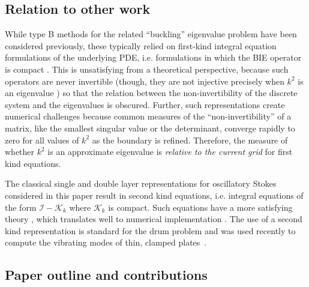 \subsection{Relation to other work}

While type B methods for the
related ``buckling'' eigenvalue problem
have been considered previously,
these typically relied on first-kind integral
equation formulations of the underlying PDE,
i.e. formulations in which the BIE operator is
compact \cite{kitahara2014boundary,antunes2011buckling}.
%
This is unsatisfying from a theoretical
perspective, because such operators are never invertible
(though, they are not injective precisely when $k^2$ is an
eigenvalue \cite{kitahara2014boundary,antunes2011buckling})
so that the relation between the non-invertibility of the
discrete system and the eigenvalues is obscured.
%
Further,
such representations create numerical challenges because
common measures of the ``non-invertibility'' of a matrix,
like the smallest singular value or the determinant, converge
rapidly to zero for all values of $k^2$ as the boundary is
refined. Therefore, the measure of whether $k^2$ is an
approximate eigenvalue is {\em relative to the current grid}
for first kind equations.

The classical single and double layer representations
for oscillatory Stokes considered in this paper
result in second kind equations, i.e. integral equations
of the form $\mathcal{I} - \mathcal{K}_k$ where
$\mathcal{K}_k$ is compact.
%
Such equations have a more satisfying theory
\cite{reed1972methods,colton1983integral,kress1989linear},
which translates well to numerical implementation
\cite{atkinson2009numerical,bornemann2010numerical,
  hackbusch2012integral,zhao2015robust}.
%
The use of a second kind representation is standard
for the drum problem \cite{backer2003numerical,zhao2015robust}
and was used recently to compute the vibrating
modes of thin, clamped plates~\cite{lindsay2018boundary}.

\subsection{Paper outline and contributions}

